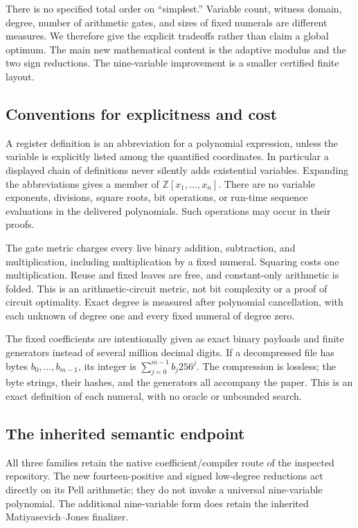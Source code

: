 \documentclass[11pt,a4paper]{article}
\newcommand{\Z}{\mathbb Z}
\theoremstyle{definition}
\theoremstyle{remark}
\begin{document}
There is no specified total order on ``simplest.''  Variable count, witness
domain, degree, number of arithmetic gates, and sizes of fixed numerals are
different measures.  We therefore give the explicit tradeoffs rather than
claim a global optimum.  The main new mathematical content is the adaptive
modulus and the two sign reductions.  The nine-variable improvement is a
smaller certified finite layout.

\subsection{Conventions for explicitness and cost}

A register definition is an abbreviation for a polynomial expression,
unless the variable is explicitly listed among the quantified coordinates.
In particular a displayed chain of definitions never silently adds
existential variables.  Expanding the abbreviations gives a member of
$\Z[x_1,\ldots,x_n]$.  There are no variable exponents, divisions,
square roots, bit operations, or run-time sequence evaluations in the
delivered polynomials.  Such operations may occur in their proofs.

The gate metric charges every live binary addition, subtraction, and
multiplication, including multiplication by a fixed numeral.  Squaring
costs one multiplication.  Reuse and fixed leaves are free, and
constant-only arithmetic is folded.  This is an arithmetic-circuit metric,
not bit complexity or a proof of circuit optimality.  Exact degree is
measured after polynomial cancellation, with each unknown of degree one
and every fixed numeral of degree zero.

The fixed coefficients are intentionally given as exact binary payloads
and finite generators instead of several million decimal digits.  If a
decompressed file has bytes $b_0,\ldots,b_{m-1}$, its integer is
$\sum_{j=0}^{m-1}b_j256^j$.  The compression is lossless; the byte strings,
their hashes, and the generators all accompany the paper.  This is an
exact definition of each numeral, with no oracle or unbounded search.

\subsection{The inherited semantic endpoint}

All three families retain the native coefficient/compiler route of the
inspected repository.  The new fourteen-positive and signed low-degree
reductions act directly on its Pell arithmetic; they do not invoke a
universal nine-variable polynomial.  The additional nine-variable form
does retain the inherited Matiyasevich--Jones finalizer.
\end{document}

